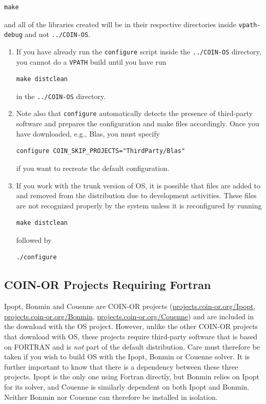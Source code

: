 \documentclass[11pt]{article}
\renewcommand{\_}{{\char"5F}}
\renewcommand{\{}{{\char"7B}}
\renewcommand{\}}{{\char"7D}}
\renewcommand{\^}{{\char"0D}}
\renewcommand{\'}{{\char"0D}}
\begin{document}
\begin{verbatim}
make
\end{verbatim}
%
and all of  the libraries created will be in their respective directories
inside {\tt vpath-debug} and not {\tt ../COIN-OS}.

\vskip 8pt
\begin{enumerate}
\item{} If you have already run the {\tt configure} script
inside the {\tt ../COIN-OS} directory, you cannot do a {\tt VPATH} build
until you have run
%
\begin{verbatim}
make distclean
\end{verbatim}
%
in the {\tt ../COIN-OS} directory.

\item{}Note also that {\tt configure} automatically detects the presence of third-party software and prepares
the configuration and make files accordingly. Once you have downloaded, e.g., Blas, you must specify
%
\begin{verbatim}
configure COIN_SKIP_PROJECTS="ThirdParty/Blas"
\end{verbatim}
\index{COIN_SKIP_PROJECTS@{\tt COIN\_SKIP\_PROJECTS}}
%
if you want to recreate the default configuration.%

\item{}If you work with the trunk version of OS, it is possible that files are added to
and removed from the distribution due to development activities. These files are not recognized properly
by the system unless it is reconfigured by running
\begin{verbatim}
make distclean
\end{verbatim}
followed by 
\begin{verbatim}
./configure
\end{verbatim}
\end{enumerate}

\subsection{COIN-OR Projects Requiring Fortran}\label{section:ipopt}

%
%
%
Ipopt, Bonmin and Couenne are COIN-OR projects 
(\url{projects.coin-or.org/Ipopt}, \url{projects.coin-or.org/Bonmin}, \url{projects.coin-or.org/Couenne})
and are included in the download with the OS project.
However, unlike the other COIN-OR projects that download with OS, these projects require third-party software
that is based on FORTRAN and is {\it not} part of the default distribution. Care must therefore be taken if
you wish to build OS with the Ipopt, Bonmin or Couenne solver. It is further important to know that there is a 
dependency between these three projects. Ipopt is the only one using Fortran directly, but Bonmin relies on Ipopt
for its solver, and Couenne is similarly dependent on both Ipopt and Bonmin. Neither Bonmin nor Couenne can therefore 
be installed in isolation.
\end{document}
